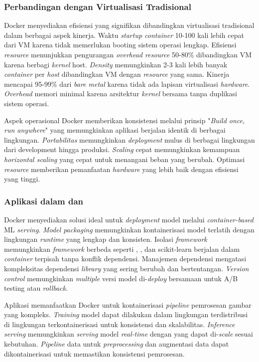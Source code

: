 \subsubsection{Perbandingan dengan Virtualisasi Tradisional}

Docker menyediakan efisiensi yang signifikan dibandingkan virtualisasi tradisional dalam berbagai aspek kinerja. Waktu \emph{startup container} 10-100 kali lebih cepat dari VM karena tidak memerlukan booting sistem operasi lengkap. Efisiensi \emph{resource} menunjukkan pengurangan \emph{overhead resource} 50-80\% dibandingkan VM karena berbagi \emph{kernel} host. \emph{Density} memungkinkan 2-3 kali lebih banyak \emph{container} per \emph{host} dibandingkan VM dengan \emph{resource} yang sama. Kinerja \cpu mencapai 95-99\% dari \emph{bare metal} karena tidak ada lapisan virtualisasi \emph{hardware}. \emph{Overhead} memori minimal karena arsitektur \emph{kernel} bersama tanpa duplikasi sistem operasi.

Aspek operasional Docker memberikan konsistensi melalui prinsip "\emph{Build once, run anywhere}" yang memungkinkan aplikasi berjalan identik di berbagai lingkungan. \emph{Portabilitas} memungkinkan \emph{deployment} mulus di berbagai lingkungan dari development hingga produksi. \emph{Scaling} cepat memungkinkan kemampuan \emph{horizontal scaling} yang cepat untuk menangani beban yang berubah. Optimasi \emph{resource} memberikan pemanfaatan \emph{hardware} yang lebih baik dengan efisiensi yang tinggi.

\subsubsection{Aplikasi dalam \ml dan \cv}

Docker menyediakan solusi ideal untuk \emph{deployment} model \ml melalui \emph{container-based} ML \emph{serving}. \emph{Model packaging} memungkinkan kontainerisasi model terlatih dengan lingkungan \emph{runtime} yang lengkap dan konsisten. Isolasi \emph{framework} memungkinkan \emph{framework} \ml berbeda seperti \tensorflow, \pytorch, dan scikit-learn berjalan dalam \emph{container} terpisah tanpa konflik dependensi. Manajemen dependensi mengatasi kompleksitas dependensi \emph{library} \ml yang sering berubah dan bertentangan. \emph{Version control} memungkinkan \emph{multiple} versi model di-\emph{deploy} bersamaan untuk A/B testing atau \emph{rollback}.

Aplikasi \cv memanfaatkan Docker untuk kontainerisasi \emph{pipeline} pemrosesan gambar yang kompleks. \emph{Training} model dapat dilakukan dalam lingkungan terdistribusi di lingkungan terkontainerisasi untuk konsistensi dan skalabilitas. \emph{Inference serving} memungkinkan \emph{serving} model \cv \emph{real-time} dengan \api yang dapat di-\emph{scale} sesuai kebutuhan. \emph{Pipeline} data untuk \emph{preprocessing} dan augmentasi data dapat dikontainerisasi untuk memastikan konsistensi pemrosesan.

